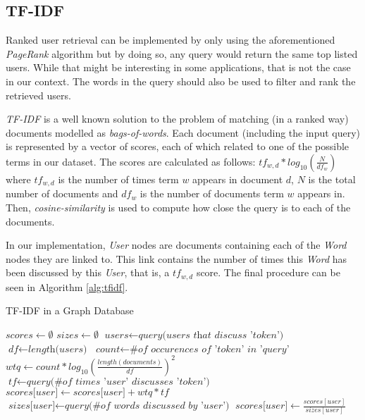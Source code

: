 \subsection{TF-IDF}

Ranked user retrieval can be implemented by only using the aforementioned
\emph{PageRank} algorithm but by doing so, any query would return the same top
listed users. While that might be interesting in some applications, that is not
the case in our context. The words in the query should also be used to filter
and rank the retrieved users.

\emph{TF-IDF} is a well known solution to the problem of matching (in a ranked
way) documents modelled as \emph{bags-of-words}. Each document (including the
input query) is represented by a vector of scores, each of which related to one
of the possible terms in our dataset. The scores are calculated as follows:
${tf}_{w, d} * log_{10}(\frac{N}{{df}_{w}})$ where ${tf}_{w, d}$ is the number
of times term $w$ appears in document $d$, $N$ is the total number of documents
and ${df}_{w}$ is the number of documents term $w$ appears in. Then,
\emph{cosine-similarity} is used to compute how close the query is to each of
the documents.

In our implementation, \emph{User} nodes are documents containing each of the
\emph{Word} nodes they are linked to. This link contains the number of times
this \emph{Word} has been discussed by this \emph{User}, that is, a ${tf}_{w,
d}$ score. The final procedure can be seen in Algorithm \ref{alg:tfidf}.

\begin{algorithm}
\caption{TF-IDF in a Graph Database}\label{alg:tfidf}
\begin{algorithmic}[1]
    \State $\textit{scores} \gets \emptyset$
    \State $\textit{sizes} \gets \emptyset$
        \State $\textit{users} \gets \textit{query(users that discuss 'token')}$
        \State $\textit{df} \gets \textit{length(users)}$
        \State $\textit{count} \gets \textit{\# of occurences of 'token' in 'query'}$
        \State $\textit{wtq} \gets \textit{$count * log_{10}(\frac{length(documents)}{df})^2$}$
        \State $\textit{tf} \gets \textit{query(\# of times 'user' discusses 'token')}$
          \State $\textit{scores[user]} \gets \textit{scores[user]} + wtq*tf$
          \State $\textit{sizes[user]} \gets \textit{query(\# of words discussed by 'user')}$
        \EndFor
    \EndFor
        \State $\textit{scores[user]} \gets \textit{$\frac{scores[user]}{sizes[user]}$}$
    \EndFor
    \State {}
\EndProcedure
\end{algorithmic}
\end{algorithm}
